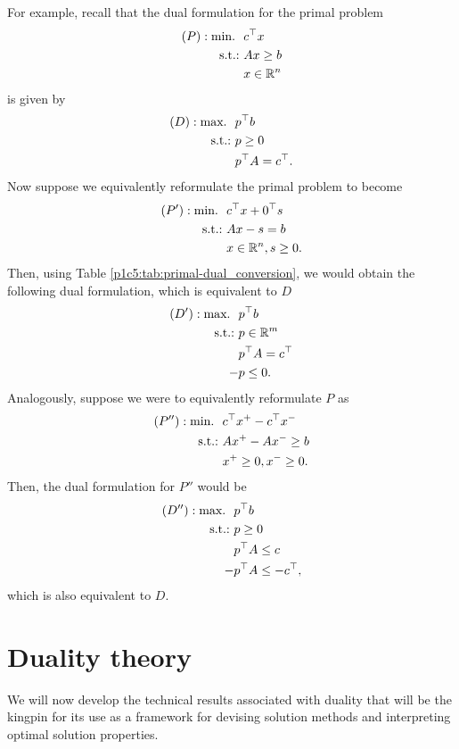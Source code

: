 For example, recall that the dual formulation for the primal problem 
%
\begin{align*}
	(P) : \mathop{\text{min.~}} \ & c^\top x \\
	\mathop{\text{s.t.:~}} &Ax \geq b \\
	&x \in \mathbb{R}^n
\end{align*}
%
is given by
%
\begin{align*}
	(D) : \mathop{\text{max.~}} \ & p^\top b \\
	\mathop{\text{s.t.:~}} &p \geq 0 \\
	&p^\top A = c^\top. 
\end{align*}
%
Now suppose we equivalently reformulate the primal problem to become
\begin{align*}
	(P') : \mathop{\text{min.~}} \ & c^\top x + 0^\top s \\
	\mathop{\text{s.t.:~}} &A x - s = b \\
	&x \in \mathbb{R}^n, s \geq 0.
\end{align*}
%
Then, using Table \ref{p1c5:tab:primal-dual_conversion}, we would obtain the following dual formulation, which is equivalent to $D$
\begin{align*}
	(D') : \mathop{\text{max.~}} \ & p^\top b \\
	\mathop{\text{s.t.:~}} &p \in \mathbb{R}^m \\
	&p^\top A = c^\top \\
	-&p \leq 0.
\end{align*}
%
Analogously, suppose we were to equivalently reformulate $P$ as 
%
\begin{align*}
	(P'') : \mathop{\text{min.~}} \ & c^\top x^+ - c^\top x^- \\
	\mathop{\text{s.t.:~}} &Ax^+ - Ax^- \geq b \\
	&x^+ \geq 0, x^- \geq 0.
\end{align*}
%
Then, the dual formulation for $P''$ would be 
%
\begin{align*}
	(D'') : \mathop{\text{max.~}} \ & p^\top b \\
	\mathop{\text{s.t.:~}} &p \geq 0 \\
	&p^\top A \leq c \\
	-&p^\top A \leq -c^\top,
\end{align*}
%
which is also equivalent to $D$.


\section{Duality theory}

We will now develop the technical results associated with duality that will be the kingpin for its use as a framework for devising solution methods and interpreting optimal solution properties. 

